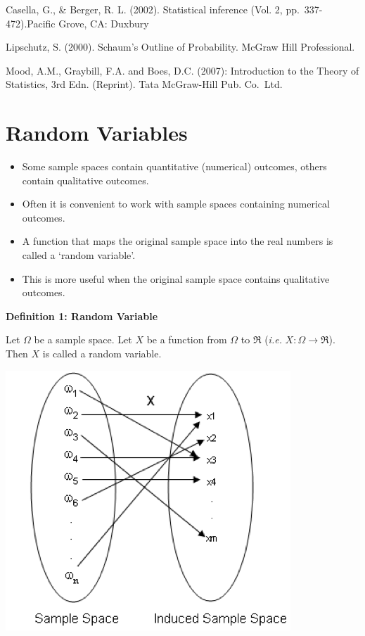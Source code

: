 \documentclass[]{book}
\providecommand{\tightlist}{%
  \setlength{\itemsep}{0pt}\setlength{\parskip}{0pt}}
\begin{document}
Casella, G., \& Berger, R. L. (2002). Statistical inference (Vol. 2, pp.~337-472).Pacific Grove, CA: Duxbury

Lipschutz, S. (2000). Schaum's Outline of Probability. McGraw Hill Professional.

Mood, A.M., Graybill, F.A. and Boes, D.C. (2007): Introduction to the Theory of Statistics, 3rd Edn. (Reprint). Tata McGraw-Hill Pub. Co.~Ltd.


\hypertarget{random-variables}{%
\chapter{Random Variables}\label{random-variables}}

\begin{itemize}
\tightlist
\item
  Some sample spaces contain quantitative (numerical) outcomes, others contain qualitative outcomes.
\item
  Often it is convenient to work with sample spaces containing numerical outcomes.
\item
  A function that maps the original sample space into the real numbers is called a `random variable'.
\item
  This is more useful when the original sample space contains qualitative outcomes.
\end{itemize}

\textbf{Definition 1: Random Variable}

Let \(\Omega\) be a sample space. Let \(X\) be a function from \(\Omega\) to \(\Re\) (\emph{i.e.} \(X:\Omega \rightarrow \Re\)). Then \(X\) is called a random variable.

\begin{center}\includegraphics[width=0.5\linewidth]{figure/Ch9_F1} \end{center}
\end{document}
